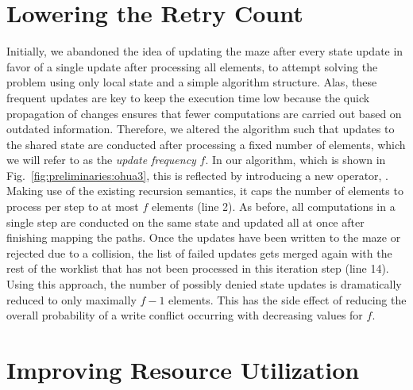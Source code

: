 \section{Lowering the Retry Count}
\label{sec:preliminaries:retries}

Initially, we abandoned the idea of updating the maze after every state update in favor of a single update after processing all elements, to attempt solving the problem using only local state and a simple algorithm structure.
Alas, these frequent updates are key to keep the execution time low because the quick propagation of changes ensures that fewer computations are carried out based on outdated information.
Therefore, we altered the algorithm such that updates to the shared state are conducted after processing a fixed number of elements, which we will refer to as the \emph{update frequency} $f$.
In our algorithm, which is shown in Fig.~\ref{fig:preliminaries:ohua3}, this is reflected by introducing a new operator, .
Making use of the existing recursion semantics, it caps the number of elements to process per step to at most $f$ elements (line 2).
As before, all computations in a single step are conducted on the same state and updated all at once after finishing mapping the paths.
Once the updates have been written to the maze or rejected due to a collision, the list of failed updates gets merged again with the rest of the worklist that has not been processed in this iteration step (line 14).
Using this approach, the number of possibly denied state updates is dramatically reduced to only maximally $f - 1$ elements.
This has the side effect of reducing the overall probability of a write conflict occurring with decreasing values for $f$.




\section{Improving Resource Utilization}
\label{sec:preliminaries:futures}








